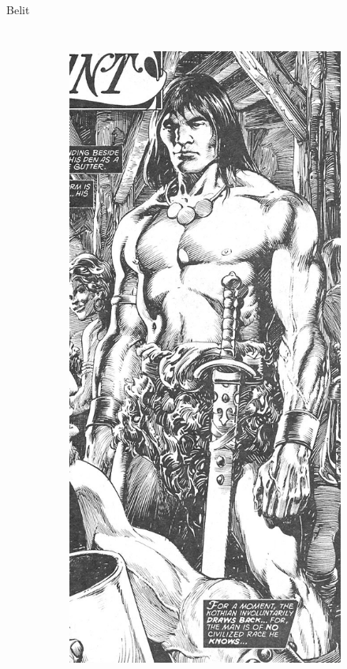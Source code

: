 \begin{frame}{Belit}
\begin{columns}
\begin{figure}[htp]
\begin{subfigure}[b]{0.23\textwidth}
				\includegraphics[width=\textwidth]{img/conan/TSSC}
			\end{subfigure}
		\end{figure}
	\end{columns}
\end{frame}
\note[itemize]{
	\item
}

